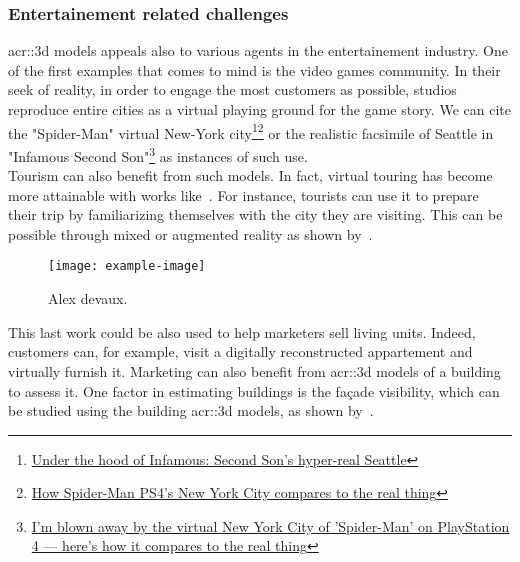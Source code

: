         \subsubsection{Entertainement related challenges}
            \gls{acr::3d} models appeals also to various agents in the entertainement industry. 
            One of the first examples that comes to mind is the video games community. 
            In their seek of reality, in order to engage the most customers as possible, studios reproduce entire cities as a virtual playing ground for the game story. 
            We can cite the "Spider-Man" virtual New-York city\footnote{
                \href{https://www.polygon.com/2013/9/25/4702318/under-the-hood-of-infamous-second-son-hyper-real-seattle}{Under the hood of Infamous: Second Son's hyper-real Seattle}
            }\footnote{
                \href{https://www.polygon.com/e3/2018/6/12/17453588/spider-man-ps4-new-york-city-avengers-demo-preview}{How Spider-Man PS4’s New York City compares to the real thing}
            } or the realistic facsimile of Seattle in "Infamous Second Son"\footnote{
                \href{http://www.businessinsider.fr/us/spider-man-ps4-new-york-city-2018-9}{I'm blown away by the virtual New York City of 'Spider-Man' on PlayStation 4 — here's how it compares to the real thing}
            } as instances of such use.\\
            Tourism can also benefit from such models. 
            In fact, virtual touring has become more attainable with works like~\textcite{koutsoudis20073d}. 
            For instance, tourists can use it to prepare their trip by familiarizing themselves with the city they are visiting. 
            This can be possible through mixed or augmented reality as shown by~\textcite{devaux20183d}.\\
            \begin{figure}[htpb]
                \centering
                \texttt{[image: example-image]}             
                \caption{
                    \label{fig::augemented_reality} Alex devaux. 
                }
            \end{figure}
            This last work could be also used to help marketers sell living units. 
            Indeed, customers can, for example, visit a digitally reconstructed appartement and virtually furnish it. 
            Marketing can also benefit from \gls{acr::3d} models of a building to assess it. 
            One factor in estimating buildings is the fa\c{c}ade visibility, which can be studied using the building \gls{acr::3d} models, as shown by~\textcite{albrecht2013assessing}. 

